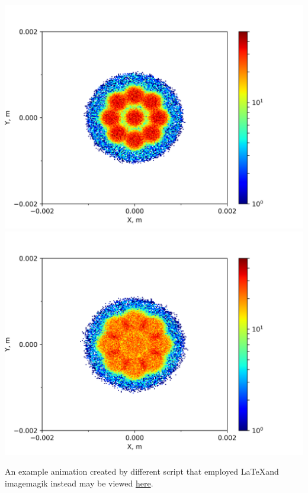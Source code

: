 \documentclass{article}
\newcommand{\mintedpython}[1]{\inputminted[frame=lines,framesep=2mm,baselinestretch=1.2,bgcolor=LightGray,fontsize=\footnotesize,linenos]{python}{#1}}
\begin{document}
\hspace*{\fill}
\includegraphics[scale=0.4]{Matplotlib_script/0002.png}
\hspace*{0.25in}
\includegraphics[scale=0.4]{Matplotlib_script/0003.png}
\hspace*{\fill}

An example animation created by different script that employed \LaTeX and imagemagik instead may be viewed \href{https://drive.google.com/file/d/1neBxOSLc-KTK15I5baHdyKoPCO4jqHwO/view}{here}.

\mintedpython{Matplotlib_script/density_plots_log.py}
\end{document}
